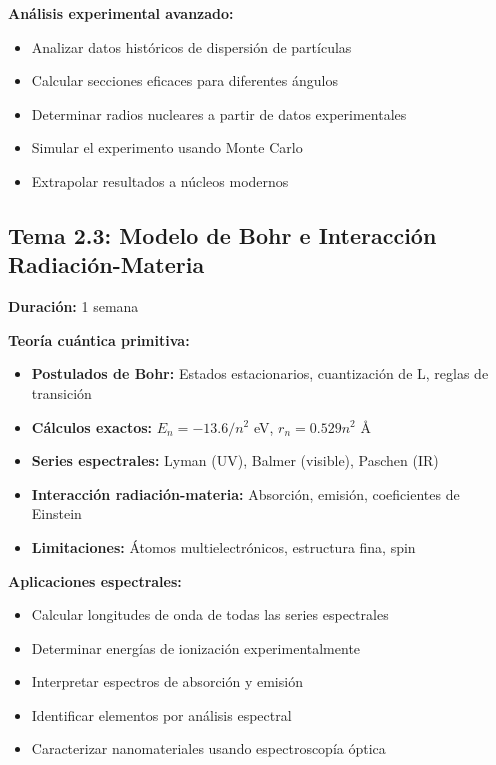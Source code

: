 \begin{tecnologiabox}
\begin{tecnologiabox}
\begin{tecnologiabox}
\begin{teknologiabox}
\begin{saberhacerbox}
\textbf{Análisis experimental avanzado:}
\begin{itemize}
\item Analizar datos históricos de dispersión de partículas
\item Calcular secciones eficaces para diferentes ángulos
\item Determinar radios nucleares a partir de datos experimentales
\item Simular el experimento usando Monte Carlo
\item Extrapolar resultados a núcleos modernos
\end{itemize}
\end{saberhacerbox}

\subsection{Tema 2.3: Modelo de Bohr e Interacción Radiación-Materia}
\textbf{Duración:} 1 semana

\begin{saberbox}
\textbf{Teoría cuántica primitiva:}
\begin{itemize}
\item \textbf{Postulados de Bohr:} Estados estacionarios, cuantización de L, reglas de transición
\item \textbf{Cálculos exactos:} $E_n = -13.6/n^2$ eV, $r_n = 0.529 n^2$ Å
\item \textbf{Series espectrales:} Lyman (UV), Balmer (visible), Paschen (IR)
\item \textbf{Interacción radiación-materia:} Absorción, emisión, coeficientes de Einstein
\item \textbf{Limitaciones:} Átomos multielectrónicos, estructura fina, spin
\end{itemize}
\end{saberbox}

\begin{saberhacerbox}
\textbf{Aplicaciones espectrales:}
\begin{itemize}
\item Calcular longitudes de onda de todas las series espectrales
\item Determinar energías de ionización experimentalmente
\item Interpretar espectros de absorción y emisión
\item Identificar elementos por análisis espectral
\item Caracterizar nanomateriales usando espectroscopía óptica
\end{itemize}
\end{saberhacerbox}


\end{teknologiabox}
\end{tecnologiabox}
\end{tecnologiabox}
\end{tecnologiabox}
